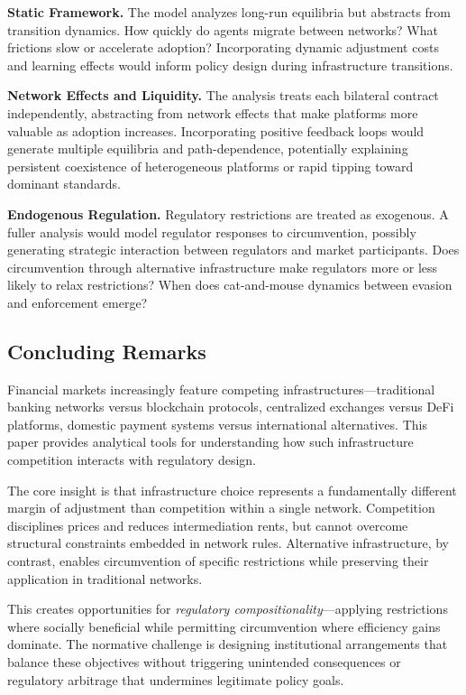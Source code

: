 \documentclass[12pt]{article}
\begin{document}
\textbf{Static Framework.} The model analyzes long-run equilibria but abstracts from transition dynamics. How quickly do agents migrate between networks? What frictions slow or accelerate adoption? Incorporating dynamic adjustment costs and learning effects would inform policy design during infrastructure transitions.

\textbf{Network Effects and Liquidity.} The analysis treats each bilateral contract independently, abstracting from network effects that make platforms more valuable as adoption increases. Incorporating positive feedback loops would generate multiple equilibria and path-dependence, potentially explaining persistent coexistence of heterogeneous platforms or rapid tipping toward dominant standards.

\textbf{Endogenous Regulation.} Regulatory restrictions are treated as exogenous. A fuller analysis would model regulator responses to circumvention, possibly generating strategic interaction between regulators and market participants. Does circumvention through alternative infrastructure make regulators more or less likely to relax restrictions? When does cat-and-mouse dynamics between evasion and enforcement emerge?

\subsection{Concluding Remarks}

Financial markets increasingly feature competing infrastructures---traditional banking networks versus blockchain protocols, centralized exchanges versus DeFi platforms, domestic payment systems versus international alternatives. This paper provides analytical tools for understanding how such infrastructure competition interacts with regulatory design.

The core insight is that infrastructure choice represents a fundamentally different margin of adjustment than competition within a single network. Competition disciplines prices and reduces intermediation rents, but cannot overcome structural constraints embedded in network rules. Alternative infrastructure, by contrast, enables circumvention of specific restrictions while preserving their application in traditional networks.

This creates opportunities for \textit{regulatory compositionality}---applying restrictions where socially beneficial while permitting circumvention where efficiency gains dominate. The normative challenge is designing institutional arrangements that balance these objectives without triggering unintended consequences or regulatory arbitrage that undermines legitimate policy goals.
\end{document}
